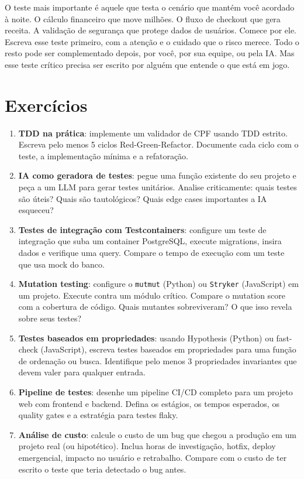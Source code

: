 O teste mais importante é aquele que testa o cenário que mantém você acordado
à noite. O cálculo financeiro que move milhões. O fluxo de checkout que gera
receita. A validação de segurança que protege dados de usuários. Comece por
ele. Escreva esse teste primeiro, com a atenção e o cuidado que o risco merece.
Todo o resto pode ser complementado depois, por você, por sua equipe, ou
pela IA. Mas esse teste crítico precisa ser escrito por alguém que entende o
que está em jogo.

\section*{Exercícios}

\begin{enumerate}
    \item \textbf{TDD na prática}: implemente um validador de CPF usando TDD
    estrito. Escreva pelo menos 5 ciclos Red-Green-Refactor. Documente cada
    ciclo com o teste, a implementação mínima e a refatoração.

    \item \textbf{IA como geradora de testes}: pegue uma função existente do seu
    projeto e peça a um LLM para gerar testes unitários. Analise criticamente:
    quais testes são úteis? Quais são tautológicos? Quais edge cases
    importantes a IA esqueceu?

    \item \textbf{Testes de integração com Testcontainers}: configure um teste
    de integração que suba um container PostgreSQL, execute migrations, insira
    dados e verifique uma query. Compare o tempo de execução com um teste que
    usa mock do banco.

    \item \textbf{Mutation testing}: configure o \texttt{mutmut} (Python) ou
    \texttt{Stryker} (JavaScript) em um projeto. Execute contra um módulo
    crítico. Compare o mutation score com a cobertura de código. Quais
    mutantes sobreviveram? O que isso revela sobre seus testes?

    \item \textbf{Testes baseados em propriedades}: usando Hypothesis (Python)
    ou fast-check (JavaScript), escreva testes baseados em propriedades para
    uma função de ordenação ou busca. Identifique pelo menos 3 propriedades
    invariantes que devem valer para qualquer entrada.

    \item \textbf{Pipeline de testes}: desenhe um pipeline CI/CD completo para
    um projeto web com frontend e backend. Defina os estágios, os tempos
    esperados, os quality gates e a estratégia para testes flaky.

    \item \textbf{Análise de custo}: calcule o custo de um bug que chegou a
    produção em um projeto real (ou hipotético). Inclua horas de investigação,
    hotfix, deploy emergencial, impacto no usuário e retrabalho. Compare com
    o custo de ter escrito o teste que teria detectado o bug antes.
\end{enumerate}

